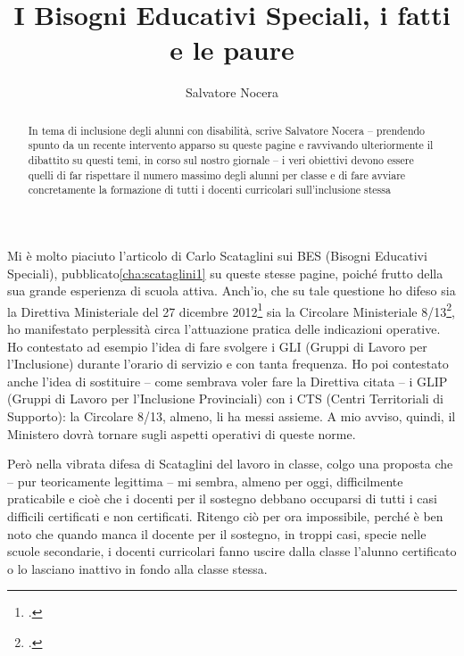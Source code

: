 \author{Salvatore Nocera}
\title{I Bisogni Educativi Speciali, i fatti e le paure }
\label{cha:nocera030613}
\begin{abstract}
In tema di inclusione degli alunni con disabilità, scrive Salvatore Nocera – prendendo spunto da un recente intervento apparso su queste pagine e ravvivando ulteriormente il dibattito su questi temi, in corso sul nostro giornale – i veri obiettivi devono essere quelli di far rispettare il numero massimo degli alunni per classe e di fare avviare concretamente la formazione di tutti i docenti curricolari sull'inclusione stessa
\end{abstract}
\maketitle
Mi è molto piaciuto l'articolo di Carlo Scataglini sui BES (Bisogni Educativi Speciali), pubblicato\ref{cha:scataglini1} su queste stesse pagine, poiché frutto della sua grande esperienza di scuola attiva. Anch'io, che su tale questione ho difeso sia la Direttiva Ministeriale del 27 dicembre 2012\footcite{dir27Dic2012} sia la Circolare Ministeriale 8/13\footcite{cm8_2013}, ho manifestato perplessità circa l'attuazione pratica delle indicazioni operative. Ho contestato ad esempio l'idea di fare svolgere i GLI (Gruppi di Lavoro per l'Inclusione) durante l'orario di servizio e con tanta frequenza. Ho poi contestato anche l'idea di sostituire – come sembrava voler fare la Direttiva citata – i GLIP (Gruppi di Lavoro per l'Inclusione Provinciali) con i CTS (Centri Territoriali di Supporto): la Circolare 8/13, almeno, li ha messi assieme. A mio avviso, quindi, il Ministero dovrà tornare sugli aspetti operativi di queste norme.

Però nella vibrata difesa di Scataglini del lavoro in classe, colgo una proposta che – pur teoricamente legittima – mi sembra, almeno per oggi, difficilmente praticabile e cioè che i docenti per il sostegno debbano occuparsi di tutti i casi difficili certificati e non certificati. Ritengo ciò per ora impossibile, perché è ben noto che quando manca il docente per il sostegno, in troppi casi, specie nelle scuole secondarie, i docenti curricolari fanno uscire dalla classe l'alunno certificato o lo lasciano inattivo in fondo alla classe stessa.

